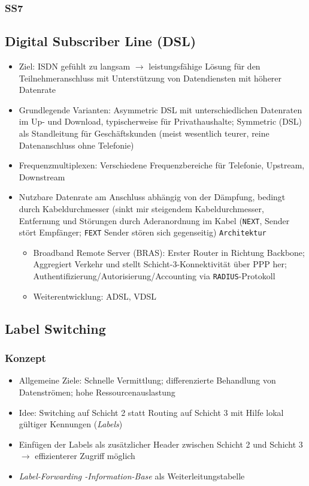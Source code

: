 \subsubsection{SS7}


\subsection{Digital Subscriber Line (DSL)}
\begin{itemize}
	\item Ziel: ISDN gefühlt zu langsam \(\rightarrow\) leistungsfähige Lösung für den Teilnehmeranschluss mit Unterstützung von Datendiensten mit höherer Datenrate
	\item Grundlegende Varianten: Asymmetric DSL mit unterschiedlichen Datenraten im Up- und Download, typischerweise für Privathaushalte; Symmetric (DSL) als Standleitung für Geschäftskunden (meist wesentlich teurer, reine Datenanschluss ohne Telefonie)
	\item Frequenzmultiplexen: Verschiedene Frequenzbereiche für Telefonie, Upstream, Downstream
	\item Nutzbare Datenrate am Anschluss abhängig von der Dämpfung, bedingt durch Kabeldurchmesser (sinkt mir steigendem Kabeldurchmesser, Entfernung und Störungen durch Aderanordnung im Kabel (\texttt{NEXT}, Sender stört Empfänger; \texttt{FEXT} Sender stören sich gegenseitig)
	\texttt{Architektur}
	\begin{itemize}
		\item Broadband Remote Server (BRAS): Erster Router in Richtung Backbone; Aggregiert Verkehr und stellt Schicht-3-Konnektivität über PPP her; Authentifizierung/Autorisierung/Accounting via \texttt{RADIUS}-Protokoll
		\item Weiterentwicklung: ADSL, VDSL
	\end{itemize}
\end{itemize}


\subsection{Label Switching}

\subsubsection{Konzept}
\begin{itemize}
	\item Allgemeine Ziele: Schnelle Vermittlung; differenzierte Behandlung von Datenströmen; hohe Ressourcenauslastung
	\item Idee: Switching auf Schicht 2 statt Routing auf Schicht 3 mit Hilfe lokal gültiger Kennungen (\textit{Labels})
	\item Einfügen der Labels als zusätzlicher Header zwischen Schicht 2 und Schicht 3 \(\rightarrow\) effizienterer Zugriff möglich
	\item \textit{Label-Forwarding -Information-Base} als Weiterleitungstabelle
\end{itemize}

